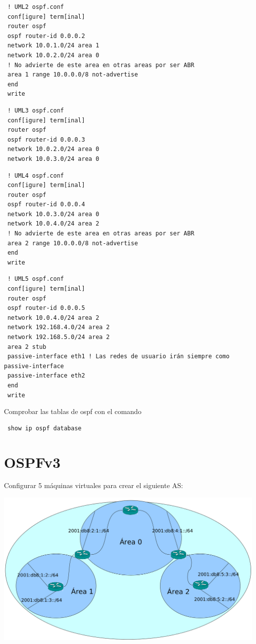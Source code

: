 \documentclass{article}
\begin{document}
\begin{verbatim}
 ! UML2 ospf.conf
 conf[igure] term[inal]
 router ospf
 ospf router-id 0.0.0.2
 network 10.0.1.0/24 area 1
 network 10.0.2.0/24 area 0
 ! No advierte de este area en otras areas por ser ABR
 area 1 range 10.0.0.0/8 not-advertise
 end
 write
\end{verbatim}

\begin{verbatim}
 ! UML3 ospf.conf
 conf[igure] term[inal]
 router ospf
 ospf router-id 0.0.0.3
 network 10.0.2.0/24 area 0
 network 10.0.3.0/24 area 0

\end{verbatim}

\begin{verbatim}
 ! UML4 ospf.conf
 conf[igure] term[inal]
 router ospf
 ospf router-id 0.0.0.4
 network 10.0.3.0/24 area 0
 network 10.0.4.0/24 area 2
 ! No advierte de este area en otras areas por ser ABR
 area 2 range 10.0.0.0/8 not-advertise
 end
 write
\end{verbatim}

\begin{verbatim}
 ! UML5 ospf.conf
 conf[igure] term[inal]
 router ospf
 ospf router-id 0.0.0.5
 network 10.0.4.0/24 area 2
 network 192.168.4.0/24 area 2
 network 192.168.5.0/24 area 2
 area 2 stub
 passive-interface eth1 ! Las redes de usuario irán siempre como passive-interface
 passive-interface eth2
 end
 write
\end{verbatim}

Comprobar las tablas de ospf con el comando

\begin{verbatim}
 show ip ospf database
\end{verbatim}

\newpage
\section{OSPFv3}
Configurar 5 máquinas virtuales para crear el siguiente AS:

\includegraphics[width=\textwidth]{ospfv3}
\end{document}
